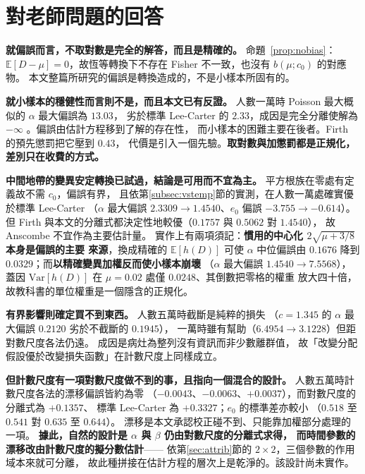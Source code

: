 \documentclass[UTF8, fontset=macnew, a4paper, 12pt]{ctexart}
\newcommand{\Ex}{\mathbb{E}}
\begin{document}
\section{對老師問題的回答}\label{sec:answer}

\textbf{就偏誤而言，不取對數是完全的解答，而且是精確的。}
命題~\ref{prop:nobias}：$\Ex[D-\mu]=0$，故恆等轉換下不存在
Fisher 不一致，也沒有 $b(\mu;c_0)$ 的對應物。
本文整篇所研究的偏誤是轉換造成的，不是小樣本所固有的。

\textbf{就小樣本的穩健性而言則不是，而且本文已有反證。}
人數一萬時 Poisson 最大概似的 $\alpha$ 最大偏誤為 $13.03$，
劣於標準 Lee-Carter 的 $2.33$，成因是完全分離使解為 $-\infty$
\citep{albert1984}。偏誤由估計方程移到了解的存在性，
而小樣本的困難主要在後者。Firth 的預先懲罰把它壓到 $0.43$，
代價是引入一個先驗。\textbf{取對數與加懲罰都是正規化，
差別只在收費的方式。}

\textbf{中間地帶的變異安定轉換已試過，結論是可用而不宜為主。}
平方根族在零處有定義故不需 $c_0$，偏誤有界，
且依第\ref{subsec:vstemp}節的實測，在人數一萬處確實優於標準 Lee-Carter
（$\alpha$ 最大偏誤 $2.3309\to1.4540$、$e_0$ 偏誤 $-3.755\to-0.614$）。
但 Firth 與本文的分離式都決定性地較優（$0.1757$ 與 $0.5062$ 對 $1.4540$），
故 Anscombe 不宜作為主要估計量。
實作上有兩項須記：\textbf{慣用的中心化 $2\sqrt{\mu+3/8}$ 本身是偏誤的主要
來源}，換成精確的 $\Ex[h(D)]$ 可使 $\alpha$ 中位偏誤由 $0.1676$ 降到
$0.0329$；而\textbf{以精確變異加權反而使小樣本崩壞}
（$\alpha$ 最大偏誤 $1.4540\to7.5568$），
蓋因 $\mathrm{Var}[h(D)]$ 在 $\mu=0.02$ 處僅 $0.0248$、其倒數把零格的權重
放大四十倍，故教科書的單位權重是一個隱含的正規化。

\textbf{有界影響則確定買不到東西。} 人數五萬時截斷是純粹的損失
（$c=1.345$ 的 $\alpha$ 最大偏誤 $0.2120$ 劣於不截斷的 $0.1945$），
一萬時雖有幫助（$6.4954\to3.1228$）但距對數尺度各法仍遠。
成因是病灶為整列沒有資訊而非少數離群值，
故「改變分配假設優於改變損失函數」在計數尺度上同樣成立。

\textbf{但計數尺度有一項對數尺度做不到的事，且指向一個混合的設計。}
人數五萬時計數尺度各法的漂移偏誤皆約為零
（$-0.0043$、$-0.0063$、$+0.0037$），而對數尺度的分離式為 $+0.1357$、
標準 Lee-Carter 為 $+0.3327$；$e_0$ 的標準差亦較小
（$0.518$ 至 $0.541$ 對 $0.635$ 至 $0.644$）。
漂移是本文承認校正碰不到、只能靠加權部分處理的一項。
\textbf{據此，自然的設計是 $\alpha$ 與 $\beta$ 仍由對數尺度的分離式求得，
而時間參數的漂移改由計數尺度的擬分數估計}——
依第\ref{sec:attrib}節的 $2\times2$，三個參數的作用域本來就可分離，
故此種拼接在估計方程的層次上是乾淨的。該設計尚未實作。
\end{document}
